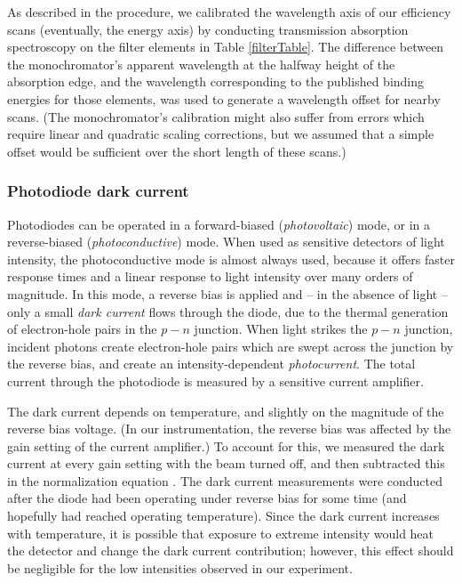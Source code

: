 As described in the procedure, we calibrated the wavelength axis of our efficiency scans (eventually, the energy axis) by conducting transmission absorption spectroscopy on the filter elements in Table \ref{filterTable}.  The difference between the monochromator's apparent wavelength at the halfway height of the absorption edge, and the wavelength corresponding to the published binding energies for those elements, was used to generate a wavelength offset for nearby scans.  (The monochromator's calibration might also suffer from errors which require linear and quadratic scaling corrections, but we assumed that a simple offset would be sufficient over the short length of these scans.)

\subsubsection{Photodiode dark current}
Photodiodes can be operated in a forward-biased (\emph{photovoltaic}) mode, or in a reverse-biased (\emph{photoconductive}) mode.  When used as sensitive detectors of light intensity, the photoconductive mode is almost always used, because it offers faster response times and a linear response to light intensity over many orders of magnitude.  In this mode, a reverse bias is applied and -- in the absence of light -- only a small \emph{dark current} flows through the diode, due to the thermal generation of electron-hole pairs in the $p-n$ junction.  When light strikes the $p-n$ junction, incident photons create electron-hole pairs which are swept across the junction by the reverse bias, and create an intensity-dependent \emph{photocurrent}.  The total current through the photodiode is measured by a sensitive current amplifier.

The dark current depends on temperature, and slightly on the magnitude of the reverse bias voltage.  (In our instrumentation, the reverse bias was affected by the gain setting of the current amplifier.)  To account for this, we measured the dark current at every gain setting with the beam turned off, and then subtracted this in the normalization equation .  The dark current measurements were conducted after the diode had been operating under reverse bias for some time (and hopefully had reached operating temperature).  Since the dark current increases with temperature, it is possible that exposure to extreme intensity would heat the detector and change the dark current contribution; however, this effect should be negligible for the low intensities observed in our experiment.

